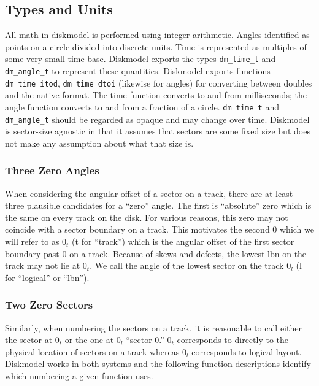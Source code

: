 
\subsection{Types and Units}

All math in diskmodel is performed using integer arithmetic.  Angles
identified as points on a circle divided into discrete units.  Time is
represented as multiples of some very small time base.  Diskmodel
exports the types \texttt{dm\_time\_t} and \texttt{dm\_angle\_t} to
represent these quantities.  Diskmodel exports functions
\texttt{dm\_time\_itod}, \texttt{dm\_time\_dtoi} (likewise for angles)
for converting between doubles and the native format.  The time
function converts to and from milliseconds; the angle function
converts to and from a fraction of a circle.  \texttt{dm\_time\_t} and
\texttt{dm\_angle\_t} should be regarded as opaque and may change over
time.  Diskmodel is sector-size agnostic in that it assumes that
sectors are some fixed size but does not make any assumption about
what that size is.

\subsubsection{Three Zero Angles}

When considering the angular offset of a sector on a track, there are
at least three plausible candidates for a ``zero'' angle.  The first
is ``absolute'' zero which is the same on every track on the disk.
For various reasons, this zero may not coincide with a sector
boundary on a track.  This motivates the second 0 which we will refer
to as $0_t$ (t for ``track'') which is the angular offset of the first
sector boundary past 0 on a track.  Because of skews and defects, the
lowest lbn on the track may not lie at $0_t$.  We call the angle of
the lowest sector on the track $0_l$ (l for ``logical'' or ``lbn'').

\subsubsection{Two Zero Sectors}

Similarly, when numbering the sectors on a track, it is reasonable to
call either the sector at $0_t$ or the one at $0_l$ ``sector 0.''
$0_t$ corresponds to directly to the physical location of sectors on a
track whereas $0_l$ corresponds to logical layout.  Diskmodel works in
both systems and the following function descriptions identify which
numbering a given function uses.

